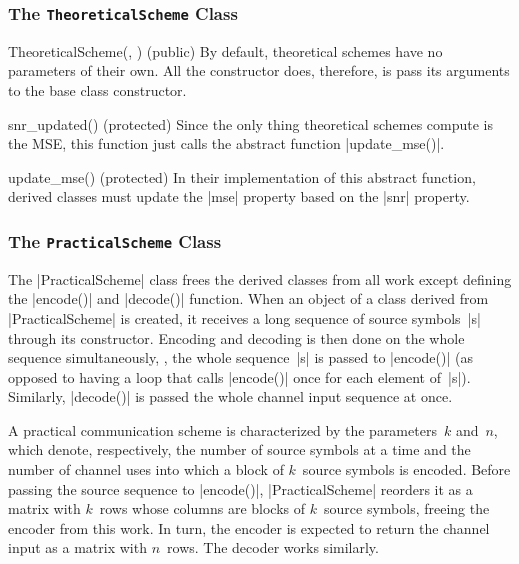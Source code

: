 \subsubsection{The \texttt{TheoreticalScheme} Class}

\begin{method}{TheoreticalScheme(, ) (public)}
  By default, theoretical schemes have no parameters of their own. All the
  constructor does, therefore, is pass its arguments to the base class
  constructor.
\end{method}

\begin{method}{snr\_updated(\obj) (protected)}
  Since the only thing theoretical schemes compute is the MSE, this function
  just calls the abstract function |update_mse()|.
\end{method}

\begin{method}{update\_mse(\obj) (protected)}
  In their implementation of this abstract function, derived classes must update
  the |mse| property based on the |snr| property. 
\end{method}


\subsubsection{The \texttt{PracticalScheme} Class}

The |PracticalScheme| class frees the derived classes from all work except
defining the |encode()| and |decode()| function. When an object of a class
derived from |PracticalScheme| is created, it receives a long sequence of source
symbols~|s| through its constructor. Encoding and decoding is then done on the
whole sequence simultaneously, \ie, the whole sequence~|s| is passed to
|encode()| (as opposed to having a loop that calls |encode()| once for each
element of~|s|). Similarly, |decode()| is passed the whole channel input
sequence at once.

A practical communication scheme is characterized by the parameters~$k$ and~$n$,
which denote, respectively, the number of source symbols at a time and the
number of channel uses into which a block of $k$~source symbols is encoded.
Before passing the source sequence to |encode()|, |PracticalScheme| reorders it
as a matrix with $k$~rows whose columns are blocks of $k$~source symbols,
freeing the encoder from this work. In turn, the encoder is expected to return
the channel input as a matrix with $n$~rows. The decoder works similarly.

